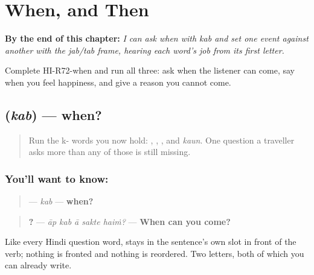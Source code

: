 
\chapter{When, and Then}
\label{ch:hi-when-then}

\begin{chapteropening}
\textbf{By the end of this chapter:} \emph{I can ask when with kab and set one event against another with the jab/tab frame, hearing each word's job from its first letter.}

Complete HI-R72-when and run all three: ask when the listener can come, say when you feel happiness, and give a reason you cannot come.
\end{chapteropening}

\section[\texorpdfstring{\hi{कब} (kab)}{कब (kab)}]{ (\emph{kab}) — when?}

\label{lesson:HI-C72-kab}



\begin{quote}
Run the k- words you now hold: \textbf{}, \textbf{}, \textbf{}, and \emph{kaun}. One question a traveller asks more than any of those is still missing.
\end{quote}

\subsection*{You'll want to know: }
\begin{quote}
\textbf{} — \emph{kab} — \textbf{when?}
\end{quote}

\begin{quote}
\textbf{    ?} — \emph{āp kab ā sakte haiṁ?} — \textbf{When can you come?}
\end{quote}

Like every Hindi question word, \textbf{} stays in the sentence's own slot in front of the verb; nothing is fronted and nothing is reordered. Two letters, both of which you can already write.

